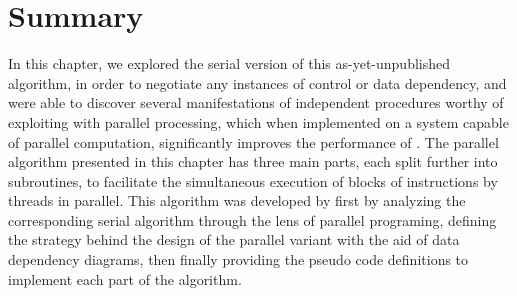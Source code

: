 \section{Summary}
In this chapter, we explored the serial version of this as-yet-unpublished algorithm, in order to negotiate any instances of control or data dependency, and were able to discover several manifestations of independent procedures worthy of exploiting with parallel processing, which when implemented on a system capable of parallel computation, significantly improves the performance of . The parallel algorithm presented in this chapter has three main parts, each split further into subroutines, to facilitate the simultaneous execution of blocks of instructions by threads in parallel. This algorithm was developed by first by analyzing the corresponding serial algorithm through the lens of parallel programing, defining the strategy behind the design of the parallel variant with the aid of data dependency diagrams, then finally providing the pseudo code definitions to implement each part of the algorithm.

